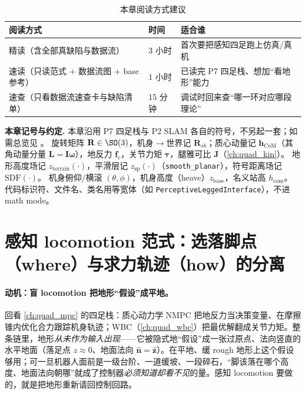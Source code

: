 \begin{table}[H]\centering\small
\caption{本章阅读方式建议}
\begin{tabular}{lll}
\toprule
阅读方式 & 时间 & 适合谁 \\
\midrule
精读（含全部真缺陷与数据流） & 3 小时 & 首次要把感知四足跑上仿真/真机 \\
速读（只读范式 + 数据流图 + base 参考） & 1 小时 & 已读完 P7 四足栈、想加“看地形”能力 \\
速查（只看数据流速查卡与缺陷清单） & 15 分钟 & 调试时回来查“哪一环对应哪段理论” \\
\bottomrule
\end{tabular}
\end{table}

\begin{note}
\textbf{本章记号与约定.}\;
本章沿用 P7 四足栈与 P2 SLAM 各自的符号，不另起一套；如需总览见 。
旋转矩阵 $\mathbf{R}\in\SO(3)$，机身$\to$世界记 $\mathbf{R}_{sb}$；质心动量记 $\mathbf{h}_{\mathrm{CoM}}$（其角动量分量 $\mathbf{L}=\mathbf{I}\boldsymbol{\omega}$），地反力 $\mathbf{f}_c$，关节力矩 $\boldsymbol{\tau}$，腿雅可比 $\mathbf{J}$（\cref{ch:quad_kin}）。
地形高度场记 $z_{\mathrm{terrain}}(\cdot)$，平滑层记 $z_{\mathrm{sp}}(\cdot)$（\texttt{smooth\_planar}），符号距离场记 $\mathrm{SDF}(\cdot)$。
机身俯仰/横滚 $(\theta,\phi)$，机身高度（heave）$z_{\mathrm{base}}$，名义站高 $h_{\mathrm{com}}$。
代码标识符、文件名、类名用等宽体（如 \texttt{PerceptiveLeggedInterface}），不进 math mode。
\end{note}

\section{感知 locomotion 范式：选落脚点（where）与求力轨迹（how）的分离}
\label{sec:lp-paradigm}

\paragraph{动机：盲 locomotion 把地形“假设”成平地。}
回看 \cref{ch:quad_mpc} 的四足栈：质心动力学 NMPC 把地反力当决策变量、在摩擦锥内优化合力跟踪机身轨迹；WBC（\cref{ch:quad_wbc}）把最优解翻成关节力矩。整条链里，地形\emph{从未作为输入出现}——它被隐式地“假设”成一张过原点、法向竖直的水平地面（落足点 $z\approx 0$、地面法向 $\hat{\mathbf{n}}=\hat{\mathbf{z}}$）。在平地、缓 rough 地形上这个假设够用；可一旦机器人面前是一级台阶、一道缓坡、一段碎石，“脚该落在哪个高度、地面法向朝哪”就成了控制器\emph{必须知道却看不见}的量。感知 locomotion 要做的，就是把地形重新请回控制回路。

